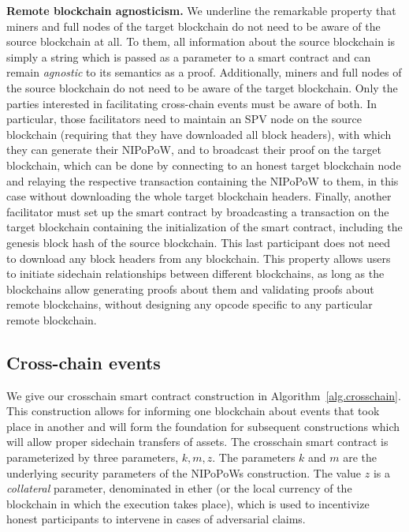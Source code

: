 \noindent
\textbf{Remote blockchain agnosticism. }
We underline the remarkable property that miners and full nodes of the target
blockchain do not need to be aware of the source blockchain at all. To them,
all information about the source blockchain is simply a string which is passed
as a parameter to a smart contract and can remain \emph{agnostic} to its
semantics as a proof. Additionally, miners and full nodes of the source
blockchain do not need to be aware of the target blockchain. Only the parties
interested in facilitating cross-chain events must be aware of both. In
particular, those facilitators need to maintain an SPV node on the source
blockchain (requiring that they have downloaded all block headers), with which
they can generate their NIPoPoW, and to broadcast their proof on the target
blockchain, which can be done by connecting to an honest target blockchain node
and relaying the respective transaction containing the NIPoPoW to them, in this
case without downloading the whole target blockchain headers. Finally, another
facilitator must set up the smart contract by broadcasting a transaction on the
target blockchain containing the initialization of the smart contract, including
the genesis block hash of the source blockchain. This last participant does not
need to download any block headers from any blockchain. This property allows
users to initiate sidechain relationships between different blockchains, as long
as the blockchains allow generating proofs about them and validating proofs
about remote blockchains, without designing any opcode specific to any
particular remote blockchain.

\subsection*{Cross-chain events}

We give our \textsf{crosschain} smart contract construction in
Algorithm~\ref{alg.crosschain}. This construction allows for informing one
blockchain about events that took place in another and will form the foundation
for subsequent constructions which will allow proper sidechain transfers of
assets. The \textsf{crosschain} smart contract is parameterized by three
parameters, $k, m, z$. The parameters $k$ and $m$ are the underlying security
parameters of the NIPoPoWs construction. The value $z$ is a \emph{collateral}
parameter, denominated in ether (or the local currency of the blockchain in
which the execution takes place), which is used to incentivize honest
participants to intervene in cases of adversarial claims.

